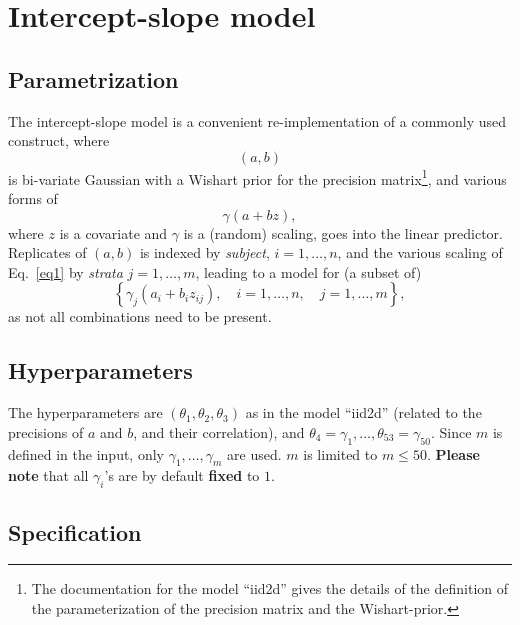 \documentclass[a4paper,11pt]{article}
\begin{document}
\section*{Intercept-slope model}

\subsection*{Parametrization}

The intercept-slope model is a convenient re-implementation of a
commonly used construct, where
\begin{displaymath}
    (a,b)
\end{displaymath}
is bi-variate Gaussian with a Wishart prior for the precision
matrix\footnote{The documentation for the model ``iid2d'' gives the
    details of the definition of the parameterization of the precision
    matrix and the Wishart-prior.}, and various forms of
\begin{equation}\label{eq1}%
    \gamma(a + bz),
\end{equation}
where $z$ is a covariate and $\gamma$ is a (random) scaling, goes into
the linear predictor. Replicates of $(a,b)$ is indexed by
\emph{subject}, $i=1, \ldots, n$, and the various scaling of
Eq.~\ref{eq1} by \emph{strata} $j=1, \ldots, m$, leading to a model
for (a subset of)
\begin{displaymath}
    \left\{\gamma_j(a_i + b_i z_{ij}), \quad i=1, \ldots,n, \quad j=1,\ldots,m\right\},
\end{displaymath}
as not all combinations need to be present.

\subsection*{Hyperparameters}

The hyperparameters are $(\theta_1,\theta_2,\theta_3)$ as in the model
``iid2d'' (related to the precisions of $a$ and $b$, and their
correlation), and
$\theta_4=\gamma_1, \ldots, \theta_{53}=\gamma_{50}$. Since $m$ is
defined in the input, only $\gamma_1, \ldots, \gamma_m$ are used. $m$
is limited to $m \le 50$. \textbf{Please note} that all $\gamma_i$'s
are by default \textbf{fixed} to $1$.


\subsection*{Specification}
\end{document}
